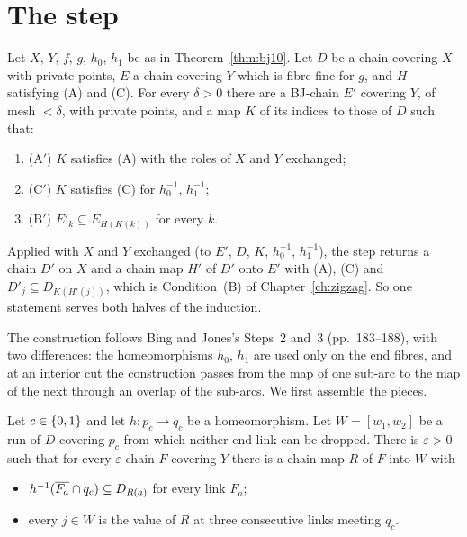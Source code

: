 
\section{The step}

\begin{theorem}\label{thm:step}
Let $X$, $Y$, $f$, $g$, $h_0$, $h_1$ be as in Theorem~\ref{thm:bj10}. Let $D$ be a chain covering $X$ with private points, $E$ a chain covering $Y$ which is
fibre-fine for $g$, and $H$ satisfying (A) and (C). For every $\delta>0$ there are a BJ-chain $E'$ covering $Y$, of mesh $<\delta$, with private points, and a map
$K$ of its indices to those of $D$ such that:
\begin{enumerate}[label=(\roman*)]
\item (A$'$) $K$ satisfies (A) with the roles of $X$ and $Y$ exchanged;
\item (C$'$) $K$ satisfies (C) for $h_0^{-1}$, $h_1^{-1}$;
\item (B$'$) $E'_k\subseteq E_{H(K(k))}$ for every $k$.
\end{enumerate}
\end{theorem}


Applied with $X$ and $Y$ exchanged (to $E'$, $D$, $K$, $h_0^{-1}$, $h_1^{-1}$), the step returns a chain $D'$ on $X$ and a chain map $H'$ of $D'$ onto $E'$
with (A), (C) and $D'_j\subseteq D_{K(H'(j))}$, which is Condition~(B) of Chapter~\ref{ch:zigzag}. So one statement serves both halves of the induction.

The construction follows Bing and Jones's Steps~2 and~3 (pp.~183--188), with two differences: the homeomorphisms $h_0$, $h_1$ are used only on the end fibres,
and at an interior cut the construction passes from the map of one sub-arc to the map of the next through an overlap of the sub-arcs. We first assemble the
pieces.

\begin{lemma}\label{lem:end-piece}
Let $c\in\left\{ 0,1 \right\}$ and let $h\colon p_c\to q_c$ be a homeomorphism. Let $W=[w_1,w_2]$ be a run of $D$ covering $p_c$ from which neither end link can be dropped. There
is $\varepsilon>0$ such that for every $\varepsilon$-chain $F$ covering $Y$ there is a chain map $R$ of $F$ into $W$ with
\begin{itemize}
\item $h^{-1}(\overline{F_a}\cap q_c)\subseteq D_{R(a)}$ for every link $F_a$;
\item every $j\in W$ is the value of $R$ at three consecutive links meeting $q_c$.
\end{itemize}
\end{lemma}

